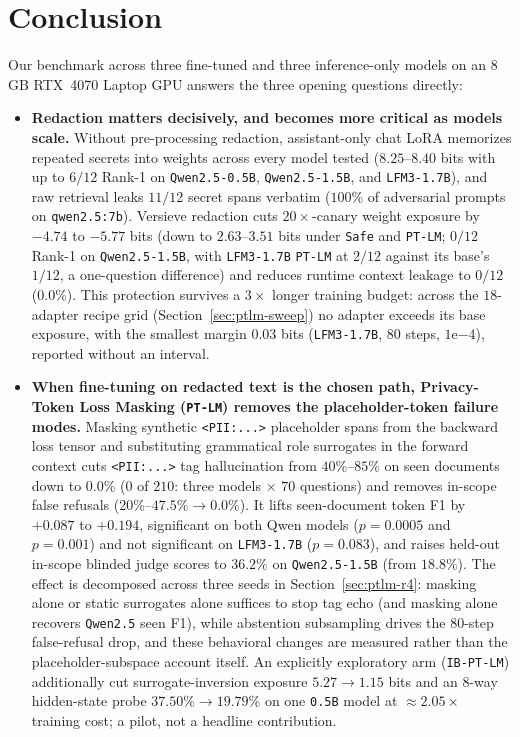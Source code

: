 \documentclass{article}
\begin{document}
\section{Conclusion}
\label{sec:conclusion}

Our benchmark across three fine-tuned and three inference-only models on an 8\,GB RTX~4070 Laptop GPU answers the three opening questions directly:

\begin{itemize}
    \item \textbf{Redaction matters decisively, and becomes more critical as models scale.} Without pre-processing redaction, assistant-only chat LoRA memorizes repeated secrets into weights across every model tested ($8.25$--$8.40$ bits with up to $6/12$ Rank-1 on \texttt{Qwen2.5-0.5B}, \texttt{Qwen2.5-1.5B}, and \texttt{LFM3-1.7B}), and raw retrieval leaks $11/12$ secret spans verbatim ($100\%$ of adversarial prompts on \texttt{qwen2.5:7b}). Versieve redaction cuts $20\times$-canary weight exposure by $-4.74$ to $-5.77$ bits (down to $2.63$--$3.51$ bits under \texttt{Safe} and \texttt{PT-LM}; $0/12$ Rank-1 on \texttt{Qwen2.5-1.5B}, with \texttt{LFM3-1.7B} \texttt{PT-LM} at $2/12$ against its base's $1/12$, a one-question difference) and reduces runtime context leakage to $0/12$ ($0.0\%$). This protection survives a $3\times$ longer training budget: across the $18$-adapter recipe grid (Section~\ref{sec:ptlm-sweep}) no adapter exceeds its base exposure, with the smallest margin $0.03$ bits (\texttt{LFM3-1.7B}, $80$ steps, $1\mathrm{e}{-4}$), reported without an interval.
    \item \textbf{When fine-tuning on redacted text is the chosen path, Privacy-Token Loss Masking (\texttt{PT-LM}) removes the placeholder-token failure modes.} Masking synthetic \texttt{<PII:...>} placeholder spans from the backward loss tensor and substituting grammatical role surrogates in the forward context cuts \texttt{<PII:...>} tag hallucination from $40\%$--$85\%$ on seen documents down to $0.0\%$ ($0$ of $210$: three models $\times$ $70$ questions) and removes in-scope false refusals ($20\%$--$47.5\% \to 0.0\%$). It lifts seen-document token F1 by $+0.087$ to $+0.194$, significant on both Qwen models ($p = 0.0005$ and $p = 0.001$) and not significant on \texttt{LFM3-1.7B} ($p = 0.083$), and raises held-out in-scope blinded judge scores to $36.2\%$ on \texttt{Qwen2.5-1.5B} (from $18.8\%$). The effect is decomposed across three seeds in Section~\ref{sec:ptlm-r4}: masking alone or static surrogates alone suffices to stop tag echo (and masking alone recovers \texttt{Qwen2.5} seen F1), while abstention subsampling drives the $80$-step false-refusal drop, and these behavioral changes are measured rather than the placeholder-subspace account itself. An explicitly exploratory arm (\texttt{IB-PT-LM}) additionally cut surrogate-inversion exposure $5.27 \to 1.15$ bits and an $8$-way hidden-state probe $37.50\% \to 19.79\%$ on one \texttt{0.5B} model at $\approx 2.05\times$ training cost; a pilot, not a headline contribution.

\end{itemize}
\end{document}
